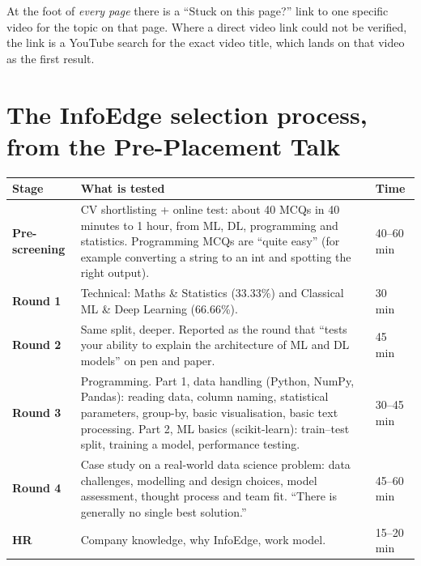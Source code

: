 At the foot of \emph{every page} there is a ``Stuck on this page?'' link to one specific video for the
topic on that page. Where a direct video link could not be verified, the link is a YouTube search for the
exact video title, which lands on that video as the first result.

\section*{The InfoEdge selection process, from the Pre-Placement Talk}

\begin{center}
\small
\begin{tabularx}{\linewidth}{>{\bfseries}l X l}
\toprule
Stage & What is tested & Time\\
\midrule
Pre-screening & CV shortlisting + online test: about 40 MCQs in 40 minutes to 1 hour, from ML, DL,
programming and statistics. Programming MCQs are ``quite easy'' (for example converting a string to an
int and spotting the right output). & 40--60 min\\
Round 1 & Technical: Maths \& Statistics (33.33\%) and Classical ML \& Deep Learning (66.66\%). & 30 min\\
Round 2 & Same split, deeper. Reported as the round that ``tests your ability to explain the architecture
of ML and DL models'' on pen and paper. & 45 min\\
Round 3 & Programming. Part 1, data handling (Python, NumPy, Pandas): reading data, column naming,
statistical parameters, group-by, basic visualisation, basic text processing. Part 2, ML basics
(scikit-learn): train--test split, training a model, performance testing. & 30--45 min\\
Round 4 & Case study on a real-world data science problem: data challenges, modelling and design choices,
model assessment, thought process and team fit. ``There is generally no single best solution.'' & 45--60 min\\
HR & Company knowledge, why InfoEdge, work model. & 15--20 min\\
\bottomrule
\end{tabularx}
\end{center}


